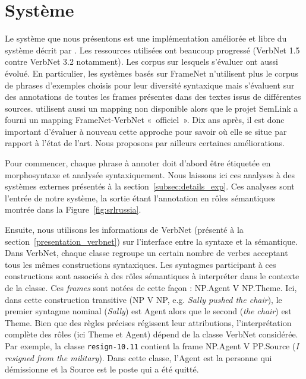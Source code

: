 \section{Système}

Le système que nous présentons est une implémentation améliorée et libre du
système décrit par \cite{swier2004unsupervised,swier2005exploiting}. Les
ressources utilisées ont beaucoup progressé (VerbNet 1.5 contre VerbNet 3.2
notamment). Les corpus sur lesquels s'évaluer ont aussi évolué. En particulier,
les systèmes basés sur FrameNet n'utilisent plus le corpus de phrases
d'exemples choisis pour leur diversité syntaxique mais s'évaluent sur des
annotations de toutes les frames présentes dans des textes issus de différentes
sources. \cite{swier2005exploiting} utilisent aussi un mapping non disponible
alors que le projet SemLink a fourni un mapping FrameNet-VerbNet «~officiel~».
Dix ans après, il est donc important d'évaluer à nouveau cette approche pour
savoir où elle se situe par rapport à l'état de l'art. Nous proposons par
ailleurs certaines améliorations.

Pour commencer, chaque phrase à annoter doit d'abord être étiquetée en
morphosyntaxe et analysée syntaxiquement. Nous laissons ici ces analyses à des
systèmes externes présentés à la section~\ref{subsec:details_exp}. Ces analyses
sont l'entrée de notre système, la sortie étant l'annotation en rôles
sémantiques montrée dans la Figure~\ref{fig:srlrussia}.

Ensuite, nous utilisons les informations de VerbNet (présenté à la
section~\ref{presentation_verbnet}) sur l'interface entre la syntaxe et la
sémantique. Dans VerbNet, chaque classe regroupe un certain nombre de verbes
acceptant tous les mêmes constructions syntaxiques. Les syntagmes participant à
ces constructions sont associés à des rôles sémantiques à interpréter dans le
contexte de la classe. Ces \textit{frames} sont notées de cette façon :
NP.Agent V NP.Theme. Ici, dans cette construction transitive (NP V NP, e.g.
\textit{Sally pushed the chair}), le premier syntagme nominal (\textit{Sally})
est Agent alors que le second (\textit{the chair}) est Theme.  Bien que des
règles précises régissent leur attributions, l'interprétation complète des
rôles (ici Theme et Agent) dépend de la classe VerbNet considérée. Par exemple,
la classe \texttt{resign-10.11} contient la frame NP.Agent V PP.Source
(\textit{I resigned from the military}). Dans cette classe, l'Agent est la
personne qui démissionne et la Source est le poste qui a été quitté.

